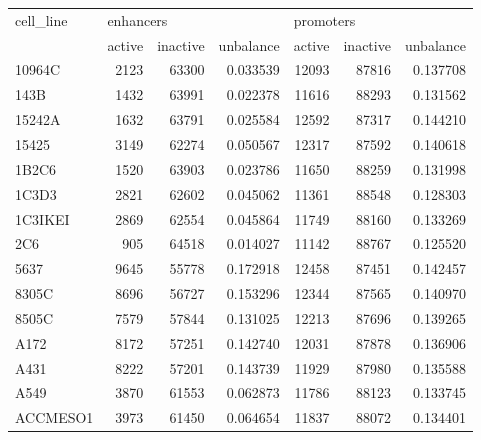 \begin{tabular}{lrrrrrr}
\toprule
                            cell\_line & \multicolumn{3}{l}{enhancers} & \multicolumn{3}{l}{promoters} \\
                                      &    active & inactive & unbalance &    active & inactive & unbalance \\
\midrule
                               10964C &      2123 &    63300 &  0.033539 &     12093 &    87816 &  0.137708 \\
                                 143B &      1432 &    63991 &  0.022378 &     11616 &    88293 &  0.131562 \\
                               15242A &      1632 &    63791 &  0.025584 &     12592 &    87317 &  0.144210 \\
                                15425 &      3149 &    62274 &  0.050567 &     12317 &    87592 &  0.140618 \\
                                1B2C6 &      1520 &    63903 &  0.023786 &     11650 &    88259 &  0.131998 \\
                                1C3D3 &      2821 &    62602 &  0.045062 &     11361 &    88548 &  0.128303 \\
                              1C3IKEI &      2869 &    62554 &  0.045864 &     11749 &    88160 &  0.133269 \\
                                  2C6 &       905 &    64518 &  0.014027 &     11142 &    88767 &  0.125520 \\
                                 5637 &      9645 &    55778 &  0.172918 &     12458 &    87451 &  0.142457 \\
                                8305C &      8696 &    56727 &  0.153296 &     12344 &    87565 &  0.140970 \\
                                8505C &      7579 &    57844 &  0.131025 &     12213 &    87696 &  0.139265 \\
                                 A172 &      8172 &    57251 &  0.142740 &     12031 &    87878 &  0.136906 \\
                                 A431 &      8222 &    57201 &  0.143739 &     11929 &    87980 &  0.135588 \\
                                 A549 &      3870 &    61553 &  0.062873 &     11786 &    88123 &  0.133745 \\
                             ACCMESO1 &      3973 &    61450 &  0.064654 &     11837 &    88072 &  0.134401 \\

\end{tabular}
